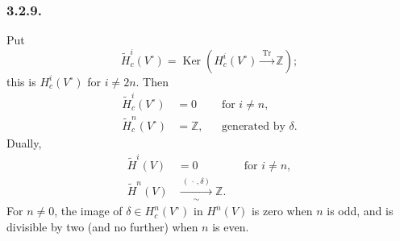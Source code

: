 \subsubsection*{3.2.9.}
Put
\[
\widetilde H_c^i(V^\circ)
=\operatorname{Ker}\!\left(
H_c^i(V^\circ)\xrightarrow{\ \operatorname{Tr}\ }\mathbb Z
\right);
\]
this is $H_c^i(V^\circ)$ for $i\ne2n$.  Then
\[
\begin{aligned}
\widetilde H_c^i(V^\circ)&=0 &&\text{for }i\ne n,\\
\widetilde H_c^n(V^\circ)&=\mathbb Z,
  &&\text{generated by }\delta.
\end{aligned}
\]
Dually,
\[
\begin{aligned}
\widetilde H^i(V)&=0 &&\text{for }i\ne n,\\
\widetilde H^n(V)&\xrightarrow[\sim]{\ (\,\cdot\,,\delta)\ }\mathbb Z.
\end{aligned}
\]
For $n\ne0$, the image of $\delta\in H_c^n(V^\circ)$ in $H^n(V)$
is zero when $n$ is odd, and is divisible by two (and no further)
when $n$ is even.
